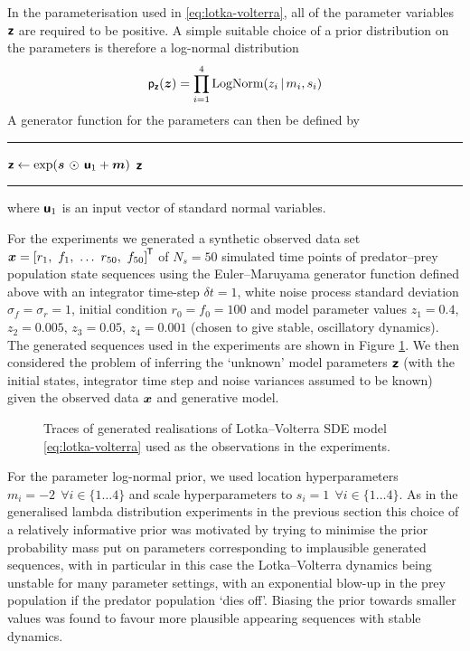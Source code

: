 In the parameterisation used in \eqref{eq:lotka-volterra}, all of the parameter variables $\boldsymbol{\mathsf{z}}$ are required to be positive. A simple suitable choice of a prior distribution on the parameters is therefore a log-normal distribution
\begin{equation}
  \mathsf{p}_{\boldsymbol{\mathsf{z}}}(\boldsymbol{z}) = \prod_{i=1}^4 \textrm{LogNorm}(z_i \operatorname{|} m_i, s_i)
\end{equation}
A generator function for the parameters can then be defined by
\vspace{3mm}
\hrule
\begin{algorithmic}
\small
{}
  \State $\boldsymbol{\mathsf{z}} \gets \exp(\boldsymbol{s} \,\odot\, \boldsymbol{\mathsf{u}}_1 + \boldsymbol{m})$
  \State \Return $\boldsymbol{\mathsf{z}}$
\EndFunction
\end{algorithmic}
\vspace{0mm}
\hrule
\vspace{1mm}
where $\boldsymbol{\mathsf{u}}_1$ is an input vector of standard normal variables.

For the experiments we generated a synthetic observed data set $\vct{x} = \lsb r_1, ~ f_1, ~ \dots ~ {r}_{50}, ~ {f}_{50} \rsb\tr$ of $N_s = 50$ simulated time points of predator--prey population state sequences using the Euler--Maruyama generator function defined above with an integrator time-step $\delta t = 1$, white noise process standard deviation $\sigma_f = \sigma_r = 1$, initial condition $r_0 = f_0 = 100$ and model parameter values ${z}_1=0.4$, ${z}_2 = 0.005$,  ${z}_3=0.05$, ${z}_4=0.001$ (chosen to give stable, oscillatory dynamics). The generated sequences used in the experiments are shown in Figure \ref{fig:lotka-volterra-observed-state-seq}. We then considered the problem of inferring the `unknown' model parameters $\boldsymbol{\mathsf{z}}$ (with the initial states, integrator time step and noise variances assumed to be known) given the observed data $\boldsymbol{x}$ and generative model. 

\begin{figure}[t]
\centering
{}
\vspace{-5mm}
\caption[Generated Lotka--Volterra sequences.]{Traces of generated realisations of Lotka--Volterra \ac{SDE} model \eqref{eq:lotka-volterra} used as the observations in the experiments.}
\label{fig:lotka-volterra-observed-state-seq}
\end{figure}

For the parameter log-normal prior, we used location hyperparameters $m_i = -2 ~~\forall i \in \lbrace 1 \dots 4 \rbrace$ and scale hyperparameters to $s_i = 1 ~~\forall i \in \lbrace 1 \dots 4 \rbrace$. As in the generalised lambda distribution experiments in the previous section this choice of a relatively informative prior was motivated by trying to minimise the prior probability mass put on parameters corresponding to implausible generated sequences, with in particular in this case the Lotka--Volterra dynamics being unstable for many parameter settings, with an exponential blow-up in the prey population if the predator population `dies off'. Biasing the prior towards smaller values was found to favour more plausible appearing sequences with stable dynamics.

